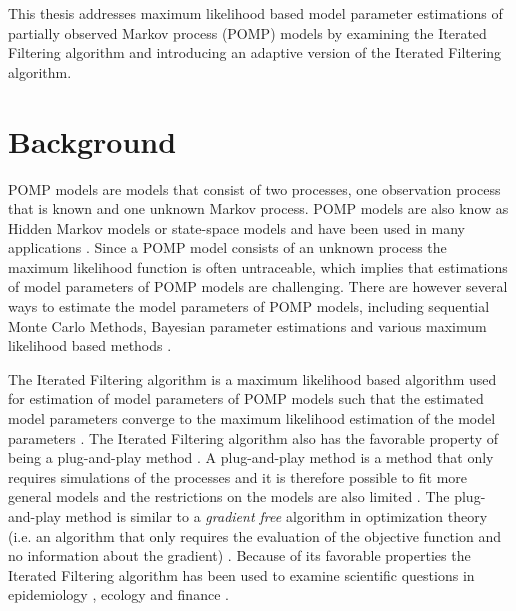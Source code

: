 \documentclass[twoside,openright]{report}
\begin{document}

\setcounter{page}{1} 

This thesis addresses maximum likelihood based model parameter estimations of partially observed Markov process (POMP) models by examining the Iterated Filtering algorithm and introducing an adaptive version of the Iterated Filtering algorithm.  


\section{Background}

POMP models are  models that consist of two processes, one observation process that is known and one unknown Markov process. POMP models are also know as Hidden Markov models or state-space models and have been used in many applications \cite{ionides2011iterated}. Since a POMP model consists of an unknown process the maximum likelihood function is often untraceable, which implies that estimations of  model parameters of POMP models are challenging. There are however several ways to estimate the model parameters of POMP models, including sequential Monte Carlo Methods, Bayesian parameter estimations and various maximum likelihood based methods \cite{kantas2009overview}.  

The Iterated Filtering algorithm is a maximum likelihood based algorithm  used for estimation of model parameters of  POMP  models such that the estimated model parameters converge to the maximum likelihood estimation of the model parameters \cite{ionides2011iterated}. The Iterated Filtering algorithm also has the favorable property of being a plug-and-play method \cite{ionides2011iterated}.  A plug-and-play method is a method  that only requires simulations of the processes and it is therefore possible to fit more general models and the restrictions on the models are also limited  \cite{he2009plug}. The plug-and-play method is similar to a \textit{gradient free} algorithm in optimization theory (i.e. an algorithm that only requires the evaluation of the objective function and no information about the gradient)  \cite{he2009plug}. Because of its favorable properties the Iterated Filtering algorithm has been used to  examine scientific questions in epidemiology  \cite{king2008inapparent}, ecology \cite{chan2011discussion} and finance \cite{breto2014idiosyncratic}. 
\end{document}
